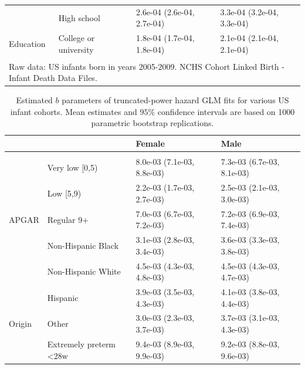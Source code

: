 \documentclass[10pt, twoside, parskip=half]{article}
\begin{document}
\begin{table}[t]
\begin{tabular}{llll}
 & High school & 2.6e-04 (2.6e-04, 2.7e-04) & 3.3e-04 (3.2e-04, 3.3e-04)\\

\multirow{-3}{*}{\raggedright\arraybackslash \hspace{1em}Education} & College or university & 1.8e-04 (1.7e-04, 1.8e-04) & 2.1e-04 (2.1e-04, 2.1e-04)\\
\bottomrule
\multicolumn{4}{l}{\textsuperscript{} Raw data: US infants born in years 2005-2009. NCHS Cohort Linked Birth - Infant Death Data Files.}\\
\end{tabular}
\end{table}

\clearpage

\begin{table}[t]

\caption{\label{tab:tab-ci-b}Estimated $b$ parameters of truncated-power hazard GLM fits for various US infant cohorts. Mean estimates and $95\%$ confidence intervals are based on 1000 parametric bootstrap replications.}
\centering
\begin{tabular}{llll}
\toprule
\textbf{} & \textbf{} & \textbf{Female} & \textbf{Male}\\
\midrule
\addlinespace[0.3em]
\multicolumn{4}{l}{\textbf{1995-1999}}\\
 & Very low [0,5) & 8.0e-03 (7.1e-03, 8.8e-03) & 7.3e-03 (6.7e-03, 8.1e-03)\\

 & Low [5,9) & 2.2e-03 (1.7e-03, 2.7e-03) & 2.5e-03 (2.1e-03, 3.0e-03)\\

\multirow{-3}{*}{\raggedright\arraybackslash \hspace{1em}APGAR} & Regular 9+ & 7.0e-03 (6.7e-03, 7.2e-03) & 7.2e-03 (6.9e-03, 7.4e-03)\\
\cmidrule{1-4}
 & Non-Hispanic Black & 3.1e-03 (2.8e-03, 3.4e-03) & 3.6e-03 (3.3e-03, 3.8e-03)\\

 & Non-Hispanic White & 4.5e-03 (4.3e-03, 4.8e-03) & 4.5e-03 (4.3e-03, 4.7e-03)\\

 & Hispanic & 3.9e-03 (3.5e-03, 4.3e-03) & 4.1e-03 (3.8e-03, 4.4e-03)\\

\multirow{-4}{*}{\raggedright\arraybackslash \hspace{1em}Origin} & Other & 3.0e-03 (2.3e-03, 3.7e-03) & 3.7e-03 (3.1e-03, 4.3e-03)\\
\cmidrule{1-4}
 & Extremely preterm <28w & 9.4e-03 (8.9e-03, 9.9e-03) & 9.2e-03 (8.8e-03, 9.6e-03)\\


\end{tabular}
\end{table}
\end{document}
